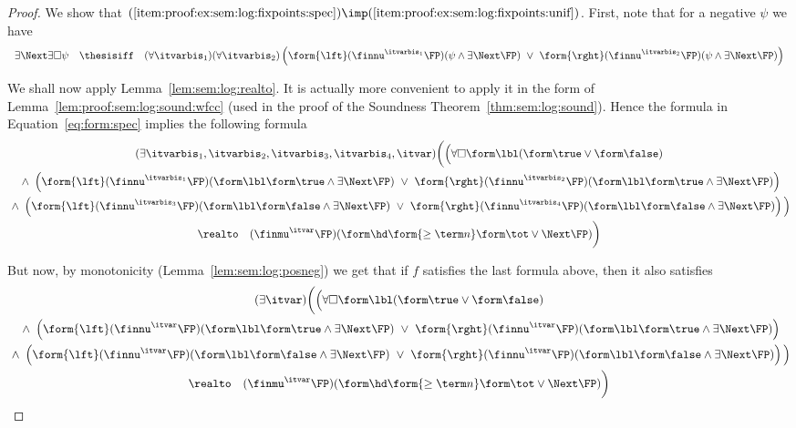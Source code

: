 \begin{proof}
We show that
\(
  \text{(\ref{item:proof:ex:sem:log:fixpoints:spec})}
  \imp
  \text{(\ref{item:proof:ex:sem:log:fixpoints:unif})}
\).
%
First, note that
for a negative $\psi$
we have
\[
\begin{array}{l l l}
  \exists\Next \exists\Box \psi
& \thesisiff
& (\forall \itvarbis_1)
  (\forall \itvarbis_2)
  \left(
  \form{\lft}(\finnu^{\itvarbis_1} \FP)(\psi \land \exists\Next\FP)
  ~\lor~
  \form{\rght}(\finnu^{\itvarbis_2} \FP)(\psi \land \exists\Next\FP)
  \right)
\end{array}
\]

We shall now apply Lemma~\ref{lem:sem:log:realto}.
It is actually more convenient to apply it in the form of
Lemma~\ref{lem:proof:sem:log:sound:wfcc}
(used in the proof of the Soundness Theorem~\ref{thm:sem:log:sound}).
Hence the formula in Equation~\eqref{eq:form:spec}
implies the following formula
\begin{multline*}
  (\exists \itvarbis_1, \itvarbis_2, \itvarbis_3, \itvarbis_4, \itvar) 
  \bigg(
  \Big(
  \forall\Box\form\lbl(\form\true \lor \form\false)
\\
  ~\land~
  \left(
  \form{\lft}(\finnu^{\itvarbis_1} \FP)(\form\lbl\form\true \land \exists\Next\FP)
  ~\lor~
  \form{\rght}(\finnu^{\itvarbis_2} \FP)(\form\lbl\form\true \land \exists\Next\FP)
  \right)
\\
  ~\land~
  \left(
  \form{\lft}(\finnu^{\itvarbis_3} \FP)(\form\lbl\form\false \land \exists\Next\FP)
  ~\lor~
  \form{\rght}(\finnu^{\itvarbis_4} \FP)(\form\lbl\form\false \land \exists\Next\FP)
  \right)
  \Big)
\\
  \realto\quad
  (\finmu^\itvar \FP)(\form\hd \form{\geq \term n} \form\tot \lor \Next \FP)
  \bigg)
\end{multline*}

But now, by monotonicity
(Lemma~\ref{lem:sem:log:posneg})
we get that if $f$ satisfies the last formula above,
then it also satisfies
\begin{multline*}
  (\exists \itvar) 
  \bigg(
  \Big(
  \forall\Box\form\lbl(\form\true \lor \form\false)
\\
  ~\land~
  \left(
  \form{\lft}(\finnu^{\itvar} \FP)(\form\lbl\form\true \land \exists\Next\FP)
  ~\lor~
  \form{\rght}(\finnu^{\itvar} \FP)(\form\lbl\form\true \land \exists\Next\FP)
  \right)
\\
  ~\land~
  \left(
  \form{\lft}(\finnu^{\itvar} \FP)(\form\lbl\form\false \land \exists\Next\FP)
  ~\lor~
  \form{\rght}(\finnu^{\itvar} \FP)(\form\lbl\form\false \land \exists\Next\FP)
  \right)
  \Big)
\\
  \realto\quad
  (\finmu^\itvar \FP)(\form\hd \form{\geq \term n} \form\tot \lor \Next \FP)
  \bigg)
\end{multline*}


\end{proof}
